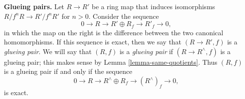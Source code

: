 {\bf Glueing pairs.} Let $R \to R'$ be a ring map that induces isomorphisms
$R/f^nR \to R'/f^nR'$ for $n > 0$. Consider the sequence
\begin{equation}
\label{equation-BL-cech-re}
0 \to R \to R' \oplus R_f \to R'_f \to 0,
\end{equation}
in which the map on the right is the difference between the two canonical
homomorphisms. If this sequence is exact, then
we say that $(R \to R', f)$ is a \emph{glueing pair}.
We will say that $(R, f)$ is a \emph{glueing pair} if
$(R \to R^\wedge, f)$ is a glueing pair; this makes sense by
Lemma \ref{lemma-same-quotients}. Thus $(R, f)$
is a glueing pair if and only if the sequence
\begin{equation}
\label{equation-BL-cech}
0 \to R \to R^\wedge \oplus R_f \to (R^\wedge)_f \to 0,
\end{equation}
is exact.

